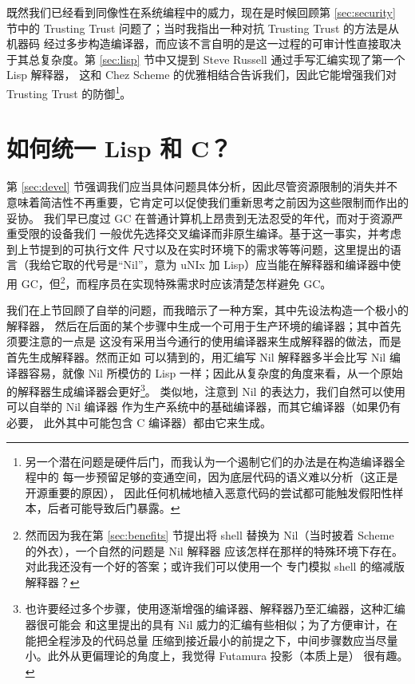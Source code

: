 既然我们已经看到同像性在系统编程中的威力，现在是时候回顾第 \ref{sec:security}
节中的 Trusting Trust 问题了；当时我指出一种对抗 Trusting Trust 的方法是从机器码
经过多步构造编译器，而应该不言自明的是这一过程的可审计性直接取决于其总复杂度。第
\ref{sec:lisp} 节中又提到 Steve Russell 通过手写汇编实现了第一个 Lisp 解释器，
这和 Chez Scheme 的优雅相结合告诉我们，因此它能增强我们对 Trusting Trust 的防御\footnote%
{另一个潜在问题是硬件后门，而我认为一个遏制它们的办法是在构造编译器全程中的
每一步预留足够的变通空间，因为底层代码的语义难以分析（这正是开源重要的原因），
因此任何机械地植入恶意代码的尝试都可能触发假阳性样本，后者可能导致后门暴露。}。

\section{如何统一 Lisp 和 C？}\label{sec:howto}

第 \ref{sec:devel} 节强调我们应当具体问题具体分析，因此尽管资源限制的消失并不
意味着简洁性不再重要，它肯定可以促使我们重新思考之前因为这些限制而作出的妥协。
我们早已度过 GC 在普通计算机上昂贵到无法忍受的年代，而对于资源严重受限的设备我们
一般优先选择交叉编译而非原生编译。基于这一事实，并考虑到上节提到的可执行文件
尺寸以及在实时环境下的需求等等问题，这里提出的语言（我给它取的代号是“Nil”，意为
uNIx 加 Lisp）应当能在解释器和编译器中使用 GC，但\footnote{然而因为我在第 \ref{sec:benefits}
节提出将 shell 替换为 Nil（当时披着 Scheme 的外衣），一个自然的问题是 Nil 解释器
应该怎样在那样的特殊环境下存在。对此我还没有一个好的答案；或许我们可以使用一个
专门模拟 shell 的缩减版解释器？}，而程序员在实现特殊需求时应该清楚怎样避免 GC。

我们在上节回顾了自举的问题，而我暗示了一种方案，其中先设法构造一个极小的解释器，
然后在后面的某个步骤中生成一个可用于生产环境的编译器；其中首先须要注意的一点是
这没有采用当今通行的使用编译器来生成解释器的做法，而是首先生成解释器。然而正如
可以猜到的，用汇编写 Nil 解释器多半会比写 Nil 编译器容易，就像 Nil 所模仿的
Lisp 一样；因此从复杂度的角度来看，从一个原始的解释器生成编译器会更好\footnote%
{也许要经过多个步骤，使用逐渐增强的编译器、解释器乃至汇编器，这种汇编器很可能会
和这里提出的具有 Nil 威力的汇编有些相似；为了方便审计，在能把全程涉及的代码总量
压缩到接近最小的前提之下，中间步骤数应当尽量小。此外从更偏理论的角度上，我觉得
Futamura 投影（本质上是） 很有趣。}。
类似地，注意到 Nil 的表达力，我们自然可以使用可以自举的 Nil 编译器
作为生产系统中的基础编译器，而其它编译器（如果仍有必要，
此外其中可能包含 C 编译器）都由它来生成。

